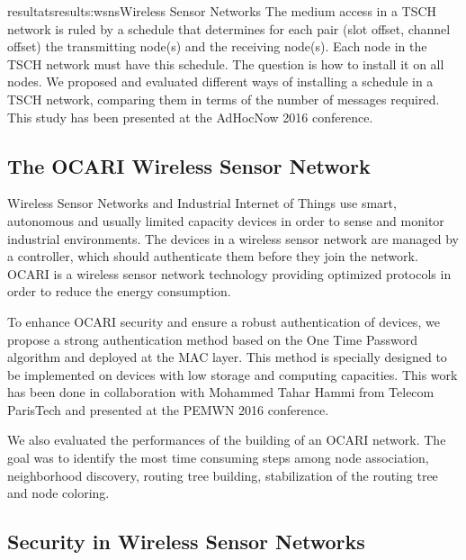 \documentclass{ra2016}
\begin{document}
\begin{module}{resultats}{results:wsns}{Wireless Sensor Networks}
The medium access in a TSCH network is ruled by a schedule that determines for each pair (slot offset, channel offset) the transmitting node(s) and the receiving node(s).
Each node in the TSCH network must have this schedule.
The question is how to install it on all nodes.
We proposed and evaluated different ways of installing a schedule in a TSCH network, comparing them in terms of the number of messages required.
This study has been presented at the AdHocNow 2016 conference.

\subsection{The OCARI Wireless Sensor Network}

\begin{participants}
\end{participants}  

Wireless Sensor Networks and Industrial Internet of Things use smart, autonomous and usually limited capacity devices in order to sense and monitor industrial environments.
The devices in a wireless sensor network are managed by a controller, which should authenticate them before they join the network.
OCARI is a wireless sensor network technology providing optimized protocols in order to reduce the energy consumption.

To enhance OCARI security and ensure a robust authentication of devices, we propose a strong authentication method based on the One Time Password algorithm and deployed at the MAC layer.
This method is specially designed to be implemented on devices with low storage and computing capacities.
This work has been done in collaboration with Mohammed Tahar Hammi from Telecom ParisTech and presented at the PEMWN 2016 conference.

We also evaluated the performances of the building of an OCARI network.
The goal was to identify the most time consuming steps among node association, neighborhood discovery, routing tree building, stabilization of the routing tree and node coloring.

\subsection{Security in Wireless Sensor Networks}


\end{module}
\end{document}
